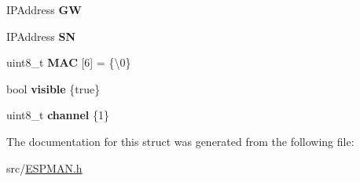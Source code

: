 \begin{DoxyCompactItemize}
I\+P\+Address {\bfseries GW}
\item 
\mbox{\label{struct_e_s_p_m_a_n_1_1settings__t_1_1_a_p__t_ab700a89554f05a4065771146e00ff046}} 
I\+P\+Address {\bfseries SN}
\item 
\mbox{\label{struct_e_s_p_m_a_n_1_1settings__t_1_1_a_p__t_a5c57f0c7577a7eab7c5c2a930ab06c78}} 
uint8\+\_\+t {\bfseries M\+AC} \mbox{[}6\mbox{]} = \{\textquotesingle{}\textbackslash{}0\textquotesingle{}\}
\item 
\mbox{\label{struct_e_s_p_m_a_n_1_1settings__t_1_1_a_p__t_a367ab9d8bfc49892fbd4a49dbab137fe}} 
bool {\bfseries visible} \{true\}
\item 
\mbox{\label{struct_e_s_p_m_a_n_1_1settings__t_1_1_a_p__t_a68b5bf8779a313d5989a70e795299ca2}} 
uint8\+\_\+t {\bfseries channel} \{1\}
\end{DoxyCompactItemize}


The documentation for this struct was generated from the following file\+:\begin{DoxyCompactItemize}
\item 
src/\hyperlink{_e_s_p_m_a_n_8h}{E\+S\+P\+M\+A\+N.\+h}\end{DoxyCompactItemize}
